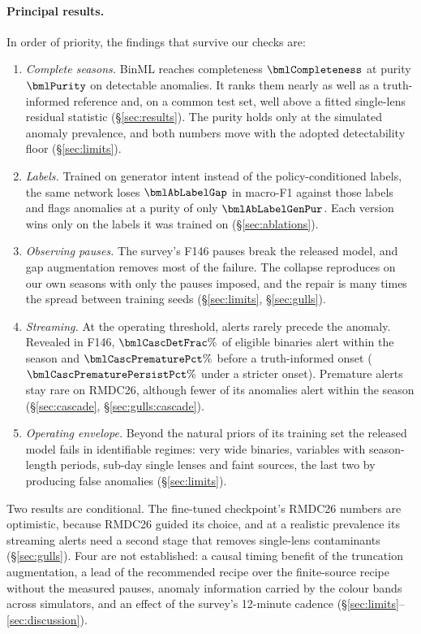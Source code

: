 \documentclass[twocolumn,linenumbers,floatfix,twocolappendix]{aastex701}
\begin{document}
\paragraph{Principal results.} In order of priority, the findings that survive our checks are:
\begin{enumerate}
\item \emph{Complete seasons.} BinML reaches completeness $\bmlCompleteness$ at purity $\bmlPurity$ on detectable
anomalies. It ranks them nearly as well as a truth-informed reference and, on a common test set, well above a fitted
single-lens residual statistic (\S\ref{sec:results}). The purity holds only at the simulated anomaly prevalence, and
both numbers move with the adopted detectability floor (\S\ref{sec:limits}).
\item \emph{Labels.} Trained on generator intent instead of the policy-conditioned labels, the same network loses
$\bmlAbLabelGap$ in macro-F1 against those labels and flags anomalies at a purity of only $\bmlAbLabelGenPur$. Each
version wins only on the labels it was trained on (\S\ref{sec:ablations}).
\item \emph{Observing pauses.} The survey's F146 pauses break the released model, and gap augmentation removes most
of the failure. The collapse reproduces on our own seasons with only the pauses imposed, and the repair is many times
the spread between training seeds (\S\ref{sec:limits}, \S\ref{sec:gulls}).
\item \emph{Streaming.} At the operating threshold, alerts rarely precede the anomaly. Revealed in F146,
$\bmlCascDetFrac\%$ of eligible binaries alert within the season and $\bmlCascPrematurePct\%$ before a truth-informed
onset ($\bmlCascPrematurePersistPct\%$ under a stricter onset). Premature alerts stay rare on RMDC26, although fewer
of its anomalies alert within the season (\S\ref{sec:cascade}, \S\ref{sec:gulls:cascade}).
\item \emph{Operating envelope.} Beyond the natural priors of its training set the released model fails in
identifiable regimes: very wide binaries, variables with season-length periods, sub-day single lenses and faint
sources, the last two by producing false anomalies (\S\ref{sec:limits}).
\end{enumerate}
Two results are conditional. The fine-tuned checkpoint's RMDC26 numbers are optimistic, because RMDC26 guided its
choice, and at a realistic prevalence its streaming alerts need a second stage that removes single-lens contaminants
(\S\ref{sec:gulls}). Four are not established: a causal timing benefit of the truncation augmentation, a lead of the
recommended recipe over the finite-source recipe without the measured pauses, anomaly information carried by the colour bands across simulators, and an
effect of the survey's 12-minute cadence (\S\ref{sec:limits}--\ref{sec:discussion}).
\end{document}
